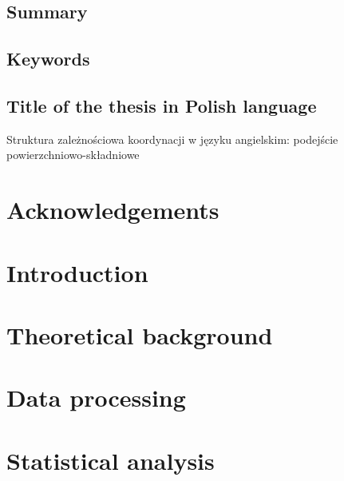 \documentclass[12pt]{report}
\begin{document}


\onehalfspacing

\pagestyle{empty}
\section*{\centering Summary}

\section*{\centering Keywords}

\section*{\centering Title of the thesis in Polish language}
Struktura zależnościowa koordynacji w języku angielskim: podejście powierzchniowo-składniowe

%
%

\tableofcontents

\chapter*{Acknowledgements}

\pagestyle{fancy}
\chapter{Introduction}\label{ch:introduction}
\chapter{Theoretical background}
\chapter{Data processing}
\chapter{Statistical analysis}
    
\end{document}
